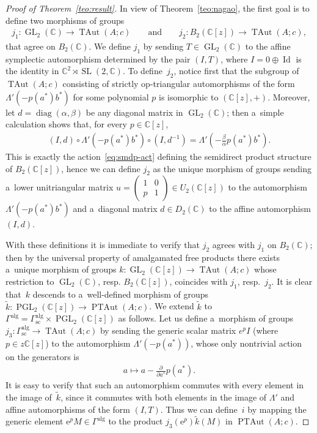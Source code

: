 \documentclass[pdftex]{sigma}
\newcommand{\bb}[1]{\mathbb{#1}}
\newcommand{\app}[3]{#1\colon #2\to #3}
\newcommand{\smm}[1]{\left(\begin{smallmatrix} #1\end{smallmatrix}\right)}
\DeclareMathOperator{\id}{Id}
\DeclareMathOperator{\diag}{diag}
\DeclareMathOperator{\GL}{GL}
\DeclareMathOperator{\SL}{SL}
\DeclareMathOperator{\PGL}{PGL}
\DeclareMathOperator{\TAut}{TAut}
\DeclareMathOperator{\PTAut}{PTAut}
\begin{document}
\begin{proof}[Proof of Theorem~\ref{teo:result}]
In view of Theorem~\ref{teo:nagao}, the f\/irst goal is to def\/ine two
morphisms of groups
\begin{gather*}
\app{j_{1}}{\GL_{2}(\bb{C})}{\TAut(A;c)}
\qquad
\text{and} %
\qquad
\app{j_{2}}{B_{2}(\bb{C}[z])}{\TAut(A;c)},
\end{gather*}
that agree on \(B_{2}(\bb{C})\).
We def\/ine \(j_{1}\) by sending \(T\in \GL_{2}(\bb{C})\) to the af\/f\/ine symplectic automorphism
determined by the pair \((I,T)\), where \(I = 0\oplus \id\) is the identity in \(\bb{C}^{2}\rtimes
\SL(2,\bb{C})\).
To def\/ine~\(j_{2}\), notice f\/irst that the subgroup of \(\TAut(A;c)\) consisting of strictly
op-triangular automorphisms of the form \(\Lambda'(-p(a^{*})b^{*})\) for some polynomial \(p\) is
isomorphic to \((\bb{C}[z],+)\).
Moreover, let \(d = \diag(\alpha,\beta)\) be any diagonal matrix in \(\GL_{2}(\bb{C})\); then a~simple
calculation shows that, for every \(p\in \bb{C}[z]\),
\begin{gather*}%
(I,d)\circ\Lambda'(-p(a^{*})b^{*})\circ(I,d^{-1})=\Lambda'\left(-\frac{\beta}{\alpha}p(a^{*})b^{*}\right).
\end{gather*}
This is exactly the action~\eqref{eq:smdp-act} def\/ining the semidirect product structure of
\(B_{2}(\bb{C}[z])\), hence we can def\/ine \(j_{2}\) as the unique morphism of groups sending a~lower
unitriangular matrix \(u = \smm{1 & 0
\\
p & 1}\in U_{2}(\bb{C}[z])\) to the automorphism \(\Lambda'(-p(a^{*})b^{*})\) and a~diagonal matrix \(d\in
D_{2}(\bb{C})\) to the af\/f\/ine automorphism \((I,d)\).

With these def\/initions it is immediate to verify that \(j_{2}\) agrees with \(j_{1}\) on
\(B_{2}(\bb{C})\); then by the universal property of amalgamated free products there exists a~unique
morphism of groups \(\app{k}{\GL_{2}(\bb{C}[z])}{\TAut(A;c)}\) whose restriction to \(\GL_{2}(\bb{C})\),
resp.
\(B_{2}(\bb{C}[z])\), coincides with \(j_{1}\), resp.~\(j_{2}\).
It is clear that~\(k\) descends to a~well-def\/ined morphism of groups
\(\app{\tilde{k}}{\PGL_{2}(\bb{C}[z])}{\PTAut(A;c)}\).
We extend \(\tilde{k}\) to \(\Gamma^{\mathrm{alg}} = \Gamma^{\mathrm{alg}}_{\mathrm{sc}} \times
\PGL_{2}(\bb{C}[z])\) as follows.
Let us def\/ine a~morphism of groups \(\app{j_{3}}{\Gamma^{\mathrm{alg}}_{\mathrm{sc}}}{\TAut(A;c)}\) by
sending the generic scalar matrix \(e^{p}I\) (where \(p\in z\bb{C}[z]\)) to the automorphism
\(\Lambda'(-p(a^{*}))\), whose only nontrivial action on the generators is
\begin{gather}
\label{eq:sc-au}
a\mapsto a-\frac{\partial}{\partial a^{*}}p(a^{*}).
\end{gather}
It is easy to verify that such an automorphism commutes with every element in the image of~\(\tilde{k}\),
since it commutes with both elements in the image of \(\Lambda'\) and af\/f\/ine automorphisms of the form
\((I,T)\).
Thus we can def\/ine~\(i\) by mapping the generic element \(\mathrm{e}^{p}M\in \Gamma^{\mathrm{alg}}\) to
the product \(j_{3}(\mathrm{e}^{p}) \tilde{k}(M)\) in \(\PTAut(A;c)\).


\end{proof}
\end{document}

